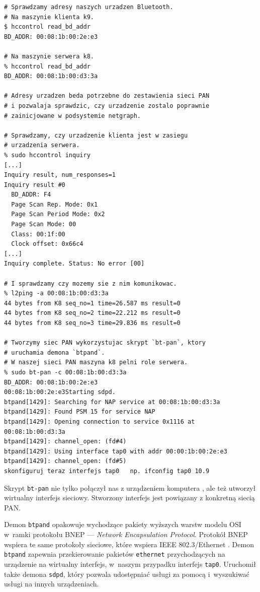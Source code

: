 \begin{lstlisting}[caption={Połączenie na poziomie protokołu \bt{} przeprowadzone z maszyny \kdziew.}]
# Sprawdzamy adresy naszych urzadzen Bluetooth.
# Na maszynie klienta k9.
$ hccontrol read_bd_addr
BD_ADDR: 00:08:1b:00:2e:e3

# Na maszynie serwera k8.
% hccontrol read_bd_addr
BD_ADDR: 00:08:1b:00:d3:3a

# Adresy urzadzen beda potrzebne do zestawienia sieci PAN
# i pozwalaja sprawdzic, czy urzadzenie zostalo poprawnie
# zainicjowane w podsystemie netgraph.

# Sprawdzamy, czy urzadzenie klienta jest w zasiegu
# urzadzenia serwera.
% sudo hccontrol inquiry
[...]
Inquiry result, num_responses=1
Inquiry result #0
  BD_ADDR: F4
  Page Scan Rep. Mode: 0x1
  Page Scan Period Mode: 0x2
  Page Scan Mode: 00
  Class: 00:1f:00
  Clock offset: 0x66c4
[...]
Inquiry complete. Status: No error [00]

# I sprawdzamy czy mozemy sie z nim komunikowac.
% l2ping -a 00:08:1b:00:d3:3a
44 bytes from K8 seq_no=1 time=26.587 ms result=0
44 bytes from K8 seq_no=2 time=22.212 ms result=0
44 bytes from K8 seq_no=3 time=29.836 ms result=0

# Tworzymy siec PAN wykorzystujac skrypt `bt-pan`, ktory
# uruchamia demona `btpand`.
# W naszej sieci PAN maszyna k8 pelni role serwera.
% sudo bt-pan -c 00:08:1b:00:d3:3a
BD_ADDR: 00:08:1b:00:2e:e3
00:08:1b:00:2e:e3Starting sdpd.
btpand[1429]: Searching for NAP service at 00:08:1b:00:d3:3a
btpand[1429]: Found PSM 15 for service NAP
btpand[1429]: Opening connection to service 0x1116 at 00:08:1b:00:d3:3a
btpand[1429]: channel_open: (fd#4)
btpand[1429]: Using interface tap0 with addr 00:00:1b:00:2e:e3
btpand[1429]: channel_open: (fd#5)
skonfiguruj teraz interfejs tap0   np. ifconfig tap0 10.9
\end{lstlisting}

Skrypt \texttt{bt-pan} nie tylko połączył nas z urządzeniem \bt{} komputera
\kosiem, ale też utworzył wirtualny interfejs sieciowy. Stworzony interfejs jest
powiązany z konkretną siecią PAN.

Demon \texttt{btpand} opakowuje wychodzące pakiety wyższych warstw modelu OSI
w~ramki protokołu BNEP --- \emph{\bt{} Network Encapsulation Protocol}. Protokół
BNEP wspiera te same protokoły sieciowe, które wspiera IEEE
802.3/Ethernet \cite{bnep}. Demon \texttt{btpand} zapewnia przekierowanie
pakietów \texttt{ethernet} przychodzących na urządzenie \bt{} na wirtualny
interfejs, w~naszym przypadku interfejs \texttt{tap0}. Uruchomił także demona
\texttt{sdpd}, który pozwala udostępniać usługi za pomocą \bt{} i~wyszukiwać
usługi na innych urządzeniach.

